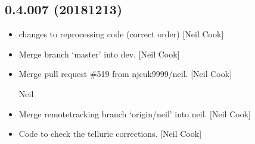 \documentclass[a4paper,10pt,english]{report}
\begin{document}
\subsection{0.4.007 (2018\sphinxhyphen{}12\sphinxhyphen{}13)}
\label{\detokenize{misc/changelog:id256}}\begin{itemize}
\item {} 
 \sphinxhyphen{} changes to reprocessing code (correct order)
{[}Neil Cook{]}

\item {} 
Merge branch ‘master’ into dev. {[}Neil Cook{]}

\item {} 
Merge pull request \#519 from njcuk9999/neil. {[}Neil Cook{]}

Neil

\item {} 
Merge remote\sphinxhyphen{}tracking branch ‘origin/neil’ into neil. {[}Neil Cook{]}

\item {} 
Code to check the telluric corrections. {[}Neil Cook{]}

\end{itemize}
\end{document}
